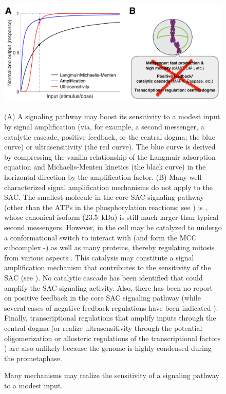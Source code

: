 \begin{figure}
    \centering
    \includegraphics[width=\textwidth]{chapters/figures/SensitivityMechanisms.pdf}
    \caption{Many mechanisms may realize the sensitivity of a signaling pathway to a modest input.}
    \noindent\justifying 
    (A) A signaling pathway may boost its sensitivity to a modest input by signal amplification (via, for example, a second messenger, a catalytic cascade, positive feedback, or the central dogma; the blue curve) or ultrasensitivity (the red curve). The blue curve is derived by compressing the vanilla relationship of the Langmuir adsorption equation and Michaelis-Menten kinetics (the black curve) in the horizontal direction by the amplification factor. (B) Many well-characterized signal amplification mechanisms do not apply to the SAC. The smallest molecule in the core SAC signaling pathway (other than the ATPs in the phosphorylation reactions; see ) is , whose canonical isoform (\SI{23.5}{kDa}) is still much larger than typical second messengers. However,  in the cell may be catalyzed to undergo a conformational switch to interact with  (and form the MCC subcomplex -) as well as many proteins, thereby regulating mitosis from various aspects \cite{Separase-SGO2-MAD2, KIF20A-MAD2}. This catalysis may constitute a signal amplification mechanism that contributes to the sensitivity of the SAC (see ). No catalytic cascade has been identified that could amplify the SAC signaling activity. Also, there has been no report on positive feedback in the core SAC signaling pathway (while several cases of negative feedback regulations have been indicated \cite{Mps1pAutophosphorylation, PP2ADephosphorylatesBUB1, PP2ADephosphorylatesKNL1, PP2A-B56}). Finally, transcriptional regulations that amplify inputs through the central dogma (or realize ultrasensitivity through the potential oligomerization or allosteric regulations of the transcriptional factors \cite{TFMultimerization, TFAllostericRegulation}) are also unlikely because the genome is highly condensed during the prometaphase.
    \label{SensitivityMechanisms}
\end{figure}


